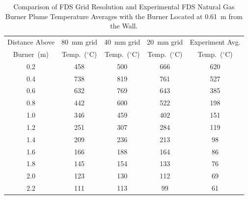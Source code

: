\documentclass[twoside]{uocthesis}
\begin{document}
\begin{table}[ht!]
  \small
  \centering
  \begin{tabular}{|c|c|c|c|c|}
    \hline Distance Above  & 80~mm grid      & 40~mm grid     & 20~mm grid    & Experiment Avg. \\
    Burner~(m)     & Temp.~($^{\circ}$C) & Temp.~($^{\circ}$C) & Temp.~($^{\circ}$C)  & Temp.~($^{\circ}$C) \\ \hline
    \hline 0.2         & 458            & 500           & 666     & 620   \\
    \hline 0.4         & 738            & 819           & 761     & 527   \\
    \hline 0.6         & 632            & 769           & 643     & 385   \\
    \hline 0.8         & 442            & 600           & 522     & 198 \\
    \hline 1.0         & 346            & 459           & 402     & 151 \\
    \hline 1.2         & 251            & 307           & 284     & 119 \\
    \hline 1.4         & 209            & 236           & 213     & 98  \\
    \hline 1.6         & 166            & 188           & 164     & 86  \\
    \hline 1.8         & 145            & 154           & 133     & 76  \\
    \hline 2.0         & 123            & 130           & 112     & 69  \\
    \hline 2.2         & 111            & 113           & 99      & 61  \\
    \hline
  \end{tabular}
  \caption[Comparison of FDS Grid Resolution and Experimental FDS Natural Gas Burner Plume Temperatures, 0.61~m from the Wall]{Comparison of FDS Grid Resolution and Experimental FDS Natural Gas Burner Plume Temperature Averages with the Burner Located at 0.61~m from the Wall.}
  \label{tab:FDSRI_Exp_Plume2d}
\end{table}
\end{document}
